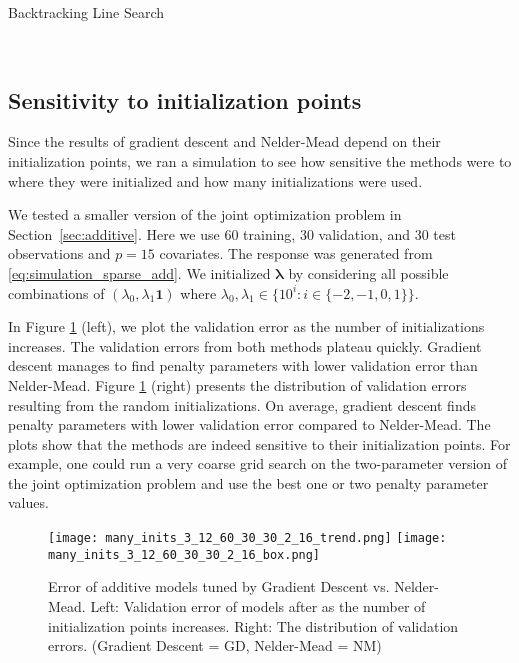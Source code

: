 \documentclass[12pt,letterpaper]{article}
\begin{document}
\begin{algorithm}
\caption{Backtracking Line Search}
\label{alg:backtracking}
         \begin{algorithmic}
  	 \\
	\ENDWHILE
	\end{algorithmic}
\end{algorithm}

\subsection{Sensitivity to initialization points}
Since the results of gradient descent and Nelder-Mead depend on their initialization points, we ran a simulation to see how sensitive the methods were to where they were initialized and how many initializations were used.

We tested a smaller version of the joint optimization problem in  Section~\ref{sec:additive}. Here we use 60 training, 30 validation, and 30 test observations and $p = 15$ covariates. The response was generated from \eqref{eq:simulation_sparse_add}. We initialized $\boldsymbol{\lambda}$ by considering all possible combinations of $(\lambda_0, \lambda_1 \boldsymbol{1})$ where $\lambda_0, \lambda_1 \in \{10^i: i\in\{-2, -1, 0, 1\}\}$.

In Figure \ref{fig:mult_starts} (left), we plot the validation error as the number of initializations increases. The validation errors from both methods plateau quickly. Gradient descent manages to find penalty parameters with lower validation error than Nelder-Mead. Figure \ref{fig:mult_starts} (right) presents the distribution of validation errors resulting from the random initializations. On average, gradient descent finds penalty parameters with lower validation error compared to Nelder-Mead. The plots show that the methods are indeed sensitive to their initialization points. For example, one could run a very coarse grid search on the two-parameter version of the joint optimization problem and use the best one or two penalty parameter values.

\begin{figure}
	\label{fig:mult_starts}
	\caption{Error of additive models tuned by Gradient Descent vs. Nelder-Mead. Left: Validation error of models after as the number of initialization points increases. Right: The distribution of validation errors. (Gradient Descent = GD, Nelder-Mead = NM)
	}
	\centering
	\texttt{[image: many\_inits\_3\_12\_60\_30\_30\_2\_16\_trend.png]}
	\texttt{[image: many\_inits\_3\_12\_60\_30\_30\_2\_16\_box.png]}
\end{figure}
\end{document}
